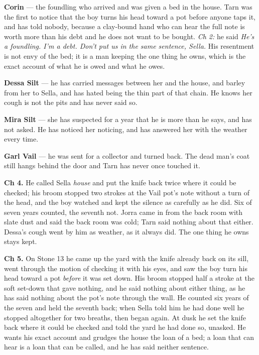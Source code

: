 \documentclass{design/chronicle}
\begin{document}
{\textbf{Corin} — the foundling who arrived and was given a bed in the house. Tarn was the first to notice that the boy turns his head toward a pot before anyone taps it, and has told nobody, because a clay-bound hand who can hear the full note is worth more than his debt and he does not want to be bought. \emph{Ch 2:} he said \emph{He’s a foundling. I’m a debt. Don’t put us in the same sentence, Sella.} His resentment is not envy of the bed; it is a man keeping the one thing he owns, which is the exact account of what he is owed and what he owes.

\textbf{Dessa Silt} — he has carried messages between her and the house, and barley from her to Sella, and has hated being the thin part of that chain. He knows her cough is not the pits and has never said so.

\textbf{Mira Silt} — she has suspected for a year that he is more than he says, and has not asked. He has noticed her noticing, and has answered her with the weather every time.

\textbf{Garl Vail} — he was sent for a collector and turned back. The dead man’s coat still hangs behind the door and Tarn has never once touched it.

\textbf{Ch 4.} He called Sella \emph{house} and put the knife back twice where it could be checked; his broom stopped two strokes at the Vail pot’s note without a turn of the head, and the boy watched and kept the silence as carefully as he did. Six of seven years counted, the seventh not. Jorra came in from the back room with slate dust and said the back room was cold; Tarn said nothing about that either. Dessa’s cough went by him as weather, as it always did. The one thing he owns stays kept.

\textbf{Ch 5.} On Stone 13 he came up the yard with the knife already back on its sill, went through the motion of checking it with his eyes, and saw the boy turn his head toward a pot \emph{before} it was set down. His broom stopped half a stroke at the soft set-down that gave nothing, and he said nothing about either thing, as he has said nothing about the pot’s note through the wall. He counted six years of the seven and held the seventh back; when Sella told him he had done well he stopped altogether for two breaths, then began again. At dusk he set the knife back where it could be checked and told the yard he had done so, unasked. He wants his exact account and grudges the house the loan of a bed; a loan that can hear is a loan that can be called, and he has said neither sentence.

}
\end{document}
